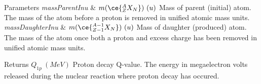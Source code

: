 \begin{DoxyParams}{Parameters}
{\em mass\+Parent\+Inu} & $m(\ce{ ^{A}_{Z}X_{N} })\ (u)$ Mass of parent (initial) atom. The mass of the atom before a proton is removed in unified atomic mass units. \\
\hline
{\em mass\+Daughter\+Inu} & $m(\ce{ ^{A-1}_{Z-1}X_{N} })\ (u)$ Mass of daughter (produced) atom. The mass of the atom once both a proton and excess charge has been removed in unified atomic mass units. \\
\hline
\end{DoxyParams}
\begin{DoxyReturn}{Returns}
$Q_{1p}\ (MeV)$ Proton decay Q-\/value. The energy in megaelectron volts released during the nuclear reaction where proton decay has occured. 
\end{DoxyReturn}

